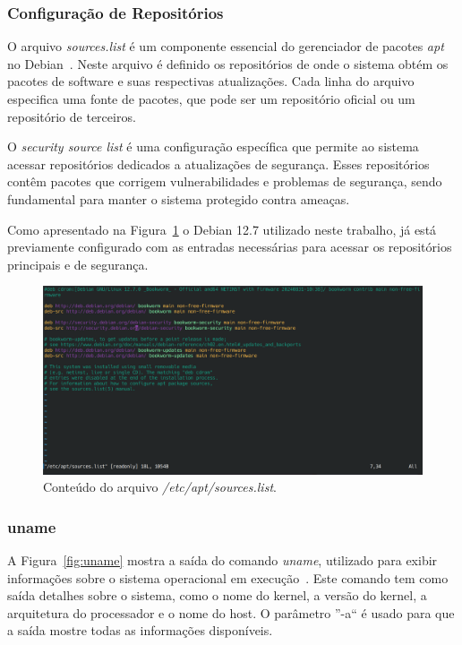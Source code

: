 \documentclass[
	12pt,				%
	oneside,   	        %
	a4paper,			%
	english,			%
	french,				%
	spanish,			%
	brazil,				%
	]{pacotes/abntex2}
\begin{document}
\subsubsection{Configuração de Repositórios}
O arquivo \textit{sources.list} é um componente essencial do gerenciador de pacotes \textit{apt} no Debian~\cite{ubuntuApt}. Neste arquivo é definido os repositórios de onde o sistema obtém os pacotes de software e suas respectivas atualizações. Cada linha do arquivo especifica uma fonte de pacotes, que pode ser um repositório oficial ou um repositório de terceiros.

O \textit{security source list} é uma configuração específica que permite ao sistema acessar repositórios dedicados a atualizações de segurança. Esses repositórios contêm pacotes que corrigem vulnerabilidades e problemas de segurança, sendo fundamental para manter o sistema protegido contra ameaças. 

Como apresentado na Figura~\ref{fig:sources} o Debian 12.7 utilizado neste trabalho, já está previamente configurado com as entradas necessárias para acessar os repositórios principais e de segurança.

\begin{figure}[H]
  \centering
  \includegraphics[scale=0.3]{figuras/source_list.png}
  \caption{Conteúdo do arquivo \textit{/etc/apt/sources.list}.}
  \label{fig:sources}
\end{figure}

\subsubsection{uname}
A Figura~\ref{fig:uname} mostra a saída do comando \textit{uname}, utilizado para exibir informações sobre o sistema operacional em execução~\cite{manUname}. Este comando tem como saída detalhes sobre o sistema, como o nome do kernel, a versão do kernel, a arquitetura do processador e o nome do host. O parâmetro ''-a`` é usado para que a saída mostre todas as informações disponíveis.
\end{document}
